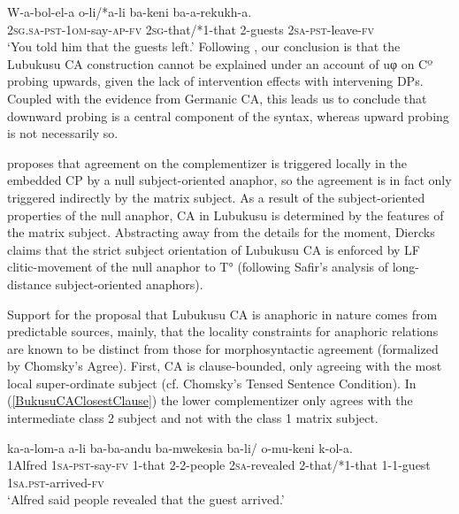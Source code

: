 \ea \label{IndirectObject=Obj}
\gll W-a-bol-el-a o-li/*a-li ba-keni ba-a-rekukh-a. \\
2\textsc{sg}.\textsc{sa}-\textsc{pst}-1\textsc{om}-say-\textsc{ap}-\textsc{fv} {2\textsc{sg}-that/*1-that} 2-guests 2\textsc{sa}-\textsc{pst}-leave-\textsc{fv} \\
\glt `You told him that the guests left.'
\z
\noindent Following \citet{Diercks:2013}, our conclusion is that the Lubukusu CA construction cannot be explained under an account of uφ on Cº probing upwards, given the lack of intervention effects with intervening DPs. Coupled with the evidence from Germanic CA, this leads us to conclude that downward probing is a central component of the syntax, whereas upward probing is not necessarily so.  

\citet{Diercks:2013} proposes that agreement on the complementizer is triggered locally in the embedded CP by a null subject-oriented anaphor, so the agreement is in fact only triggered indirectly by the matrix subject. As a result of the subject-oriented properties of the null anaphor, CA in Lubukusu is determined by the features of the matrix subject. Abstracting away from the details for the moment, Diercks claims that the strict subject orientation of Lubukusu CA is enforced by LF clitic-movement of the null anaphor to T° (following Safir’s \citeyear{Safir:2004} analysis of long-distance subject-oriented anaphors). 

Support for the proposal that Lubukusu CA is anaphoric in nature comes from predictable sources, mainly, that the locality constraints for anaphoric relations are known to be distinct from those for morphosyntactic agreement (formalized by Chomsky’s \citeyear{Chomsky:2001} Agree). First, CA is clause-bounded, only agreeing with the most local super-ordinate subject (cf. Chomsky’s \citeyear{Chomsky:1973} Tensed Sentence Condition). In (\ref{BukusuCAClosestClause}) the lower complementizer only agrees with the intermediate class 2 subject and not with the class 1 matrix subject.

\ea \label{BukusuCAClosestClause}
\gll {} ka-a-lom-a a-li ba-ba-andu ba-mwekesia ba-li/ o-mu-keni k-ol-a. \\
1Alfred 1\textsc{sa}-\textsc{pst}-say-\textsc{fv} 1-that 2-2-people 2\textsc{sa}-revealed {2-that/*1-that} 1-1-guest 1\textsc{sa}.\textsc{pst}-arrived-\textsc{fv} \\
\glt `Alfred said people revealed that the guest arrived.'
\z

